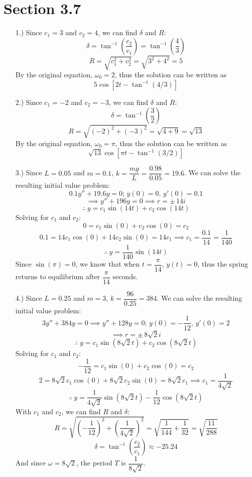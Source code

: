 \documentclass[12pt]{article}
\newcommand{\parns}[1]{\left(#1\right)}
\begin{document}
\pagestyle{fancy}
\fancyhead{}

\normalsize
\section*{Section 3.7}
\begin{itemize}
    \item [1.)] Since $c_1=3$ and $c_2=4$, we can find $\delta$ and $R$:
    \[\delta=\tan^{-1}\parns{\frac{c_2}{c_1}}=\tan^{-1}\parns{\frac{4}{3}}\]
    \[R=\sqrt{c_1^2+c_2^2}=\sqrt{3^2+4^2}=5\]
    By the original equation, $\omega_0=2$, thus the solution can be written as
    \[5\cos[2t-\tan^{-1}\parns{4/3}]\]

    \item [2.)] Since $c_1=-2$ and $c_2=-3$, we can find $\delta$ and $R$:
    \[\delta=\tan^{-1}\parns{\frac{3}{2}}\]
    \[R=\sqrt{(-2)^2+(-3)^2}=\sqrt{4+9}=\sqrt{13}\]
    By the original equation, $\omega_0=\pi$, thus the solution can be written as
    \[\sqrt{13}\cos[\pi t-\tan^{-1}\parns{3/2}]\]

    \item [3.)] Since $L=0.05$ and $m=0.1$, $k=\dfrac{mg}{L}=\dfrac{0.98}{0.05}=19.6$. We can solve the resulting initial value problem:
    \[0.1y''+19.6y=0;\,y(0)=0,\,y'(0)=0.1\]
    \[\implies y''+196y=0\implies r=\pm\,14i\]
    \[\therefore\ y=c_1\sin(14t)+c_2\cos(14t)\]
    Solving for $c_1$ and $c_2$:
    \[0=c_1\sin(0)+c_2\cos(0)=c_2\]
    \[0.1=14c_1\cos(0)+14c_2\sin(0)=14c_1\implies c_1=\frac{0.1}{14}=\frac{1}{140}\]
    \[\therefore\ y=\frac{1}{140}\sin(14t)\]
    Since $\sin(\pi)=0$, we know that when $t=\dfrac{\pi}{14}$, $y(t)=0$, thus the spring returns to equilibrium after $\dfrac{\pi}{14}$ seconds.

    \pagebreak
    \item [4.)] Since $L=0.25$ and $m=3$, $k=\dfrac{96}{0.25}=384$. We can solve the resulting initial value problem:
    \[3y''+384y=0\implies y''+128y=0;\,y(0)=-\frac{1}{12},\,y'(0)=2\]
    \[\implies r=\pm\,8\sqrt{2}i\]
    \[\therefore\ y=c_1\sin\parns{8\sqrt2t}+c_2\cos\parns{8\sqrt2t}\]
    Solving for $c_1$ and $c_2$:
    \[-\frac{1}{12}=c_1\sin(0)+c_2\cos(0)=c_2\]
    \[2=8\sqrt2c_1\cos(0)+8\sqrt2c_2\sin(0)=8\sqrt2c_1\implies c_1=\frac{1}{4\sqrt2}\]
    \[\therefore\ y=\frac{1}{4\sqrt2}\sin\parns{8\sqrt2t}-\frac{1}{12}\cos\parns{8\sqrt2t}\]
    With $c_1$ and $c_2$, we can find $R$ and $\delta$:
    \[R=\sqrt{\parns{-\frac{1}{12}}^2+\parns{\frac{1}{4\sqrt2}}^2}=\sqrt{\frac{1}{144}+\frac{1}{32}}=\sqrt{\frac{11}{288}}\]
    \[\delta=\tan^{-1}\parns{\frac{c_2}{c_1}}\approx-25.24\]
    And since $\omega=8\sqrt2$, the period $T$ is $\dfrac{1}{8\sqrt2}$.
\end{itemize}
\end{document}
